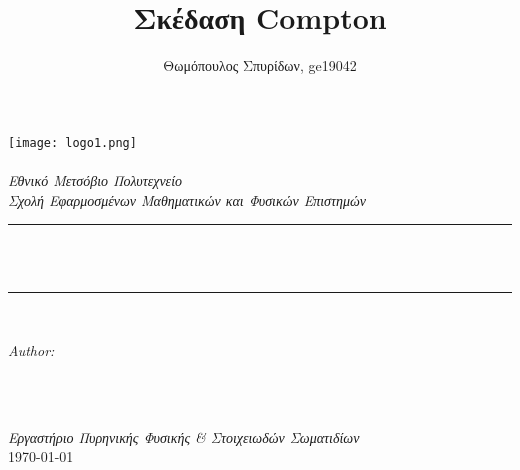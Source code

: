 \documentclass[a4paper]{article}
\title{Σκέδαση Compton}
\author{Θωμόπουλος Σπυρίδων, ge19042}
\begin{document}
\pagestyle{fancy}
\fancyhead{}
\fancyfoot{}
\fancyfoot[CE,CO]{\thepage}

%	

\begin{titlepage}




\newcommand{\HRule}{\rule{\linewidth}{0.5mm}}
\texttt{[image: logo1.png]}\\[1cm] 
\center 
\quad\\[1.5cm]
\textsl{\Large Εθνικό Μετσόβιο Πολυτεχνείο}\\[0.5cm] 
\textsl{\large Σχολή Εφαρμοσμένων Μαθηματικών και Φυσικών Επιστημών}\\[0.5cm] 
\makeatletter
\HRule \\[0.4cm]
{ \huge \bfseries \@title}\\[0.4cm] 
\HRule \\[1.5cm]
\begin{minipage}{0.4\textwidth}
\begin{flushleft} \large
\emph{Author:}\\
\@author 
\end{flushleft}
\end{minipage}
~
\begin{minipage}{0.4\textwidth}
\begin{flushright} \large

\end{flushright}
\end{minipage}\\[3cm]
\makeatother
{\large \emph{Εργαστήριο Πυρηνικής Φυσικής \& Στοιχειωδών Σωματιδίων}}\\[0.5cm]
{\large \today}\\[2cm] 
\vfill 



\end{titlepage}
\end{document}
